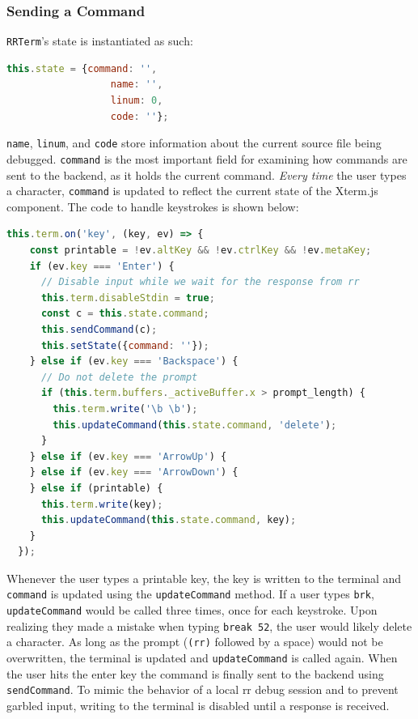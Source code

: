 \documentclass[12pt]{article}
\begin{document}
\subsubsection{Sending a Command}

\lstinline{RRTerm}'s state is instantiated as such:

\begin{lstlisting}[language=Javascript,basicstyle=\linespread{0.5}\ttfamily,caption={RRTerm's State},captionpos=b]
  this.state = {command: '',
                  name: '',
                  linum: 0,
                  code: ''};
\end{lstlisting}

\lstinline{name}, \lstinline{linum}, and \lstinline{code} store
information about the current source file being debugged.
\lstinline{command} is the most important field for examining how
commands are sent to the backend, as it holds the current command.
\textit{Every time} the user types a character, \lstinline{command} is
updated to reflect the current state of the Xterm.js component.  The
code to handle keystrokes is shown below:

\begin{lstlisting}[language=Javascript,basicstyle=\linespread{0.5}\ttfamily,caption={Handling Keystrokes},captionpos=b]
  this.term.on('key', (key, ev) => {
    const printable = !ev.altKey && !ev.ctrlKey && !ev.metaKey;
    if (ev.key === 'Enter') {
      // Disable input while we wait for the response from rr
      this.term.disableStdin = true;
      const c = this.state.command;
      this.sendCommand(c);
      this.setState({command: ''});
    } else if (ev.key === 'Backspace') {
      // Do not delete the prompt
      if (this.term.buffers._activeBuffer.x > prompt_length) {
        this.term.write('\b \b');
        this.updateCommand(this.state.command, 'delete');
      }
    } else if (ev.key === 'ArrowUp') {
    } else if (ev.key === 'ArrowDown') {
    } else if (printable) {
      this.term.write(key);
      this.updateCommand(this.state.command, key);
    }
  });
\end{lstlisting}

Whenever the user types a printable key, the key is written to the
terminal and \lstinline{command} is updated using the
\lstinline{updateCommand} method.  If a user types \lstinline{brk},
\lstinline{updateCommand} would be called three times, once for each
keystroke.  Upon realizing they made a mistake when typing
\lstinline{break 52}, the user would likely delete a character.  As
long as the prompt (\lstinline{(rr)} followed by a space) would not be
overwritten, the terminal is updated and \lstinline{updateCommand} is
called again.  When the user hits the enter key the command is finally
sent to the backend using \lstinline{sendCommand}.  To mimic the
behavior of a local rr debug session and to prevent garbled input,
writing to the terminal is disabled until a response is received.
\end{document}
